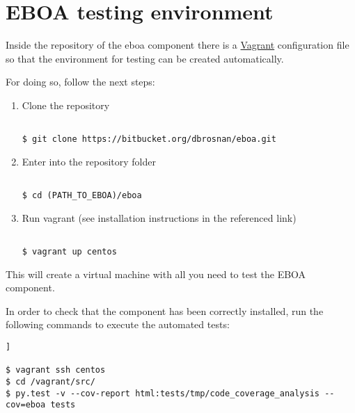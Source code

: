 \chapter{EBOA testing environment}\label{c:install_eboa}

Inside the repository of the \acrshort{eboa} component there is a \href{https://www.vagrantup.com/}{Vagrant} configuration file so that the environment for testing can be created automatically.

For doing so, follow the next steps:

\begin{enumerate}

\item Clone the repository

\begin{lstlisting}[breaklines=true, style=bash]

$ git clone https://bitbucket.org/dbrosnan/eboa.git

\end{lstlisting}

\item Enter into the repository folder

\begin{lstlisting}[breaklines=true, style=bash]

$ cd (PATH_TO_EBOA)/eboa

\end{lstlisting}

\item Run vagrant (see installation instructions in the referenced link)

\begin{lstlisting}[breaklines=true, style=bash]

$ vagrant up centos

\end{lstlisting}

\end{enumerate}

This will create a virtual machine with all you need to test the EBOA component.

In order to check that the component has been correctly installed, run the following commands to execute the automated tests:

\begin{lstlisting}[breaklines=true, style=bash]]

$ vagrant ssh centos
$ cd /vagrant/src/
$ py.test -v --cov-report html:tests/tmp/code_coverage_analysis --cov=eboa tests

\end{lstlisting}

